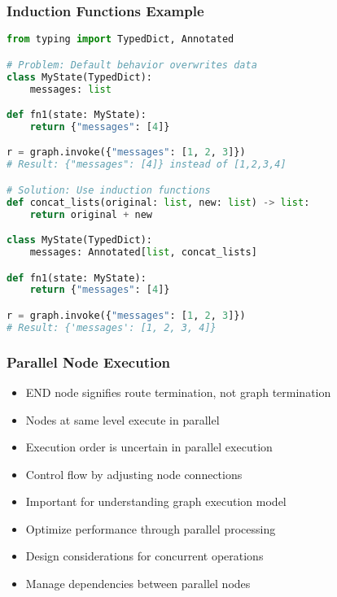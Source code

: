 \begin{frame}[fragile]\frametitle{Induction Functions Example}
      \begin{lstlisting}[language=Python, basicstyle=\tiny]
from typing import TypedDict, Annotated

# Problem: Default behavior overwrites data
class MyState(TypedDict):
    messages: list

def fn1(state: MyState):
    return {"messages": [4]}

r = graph.invoke({"messages": [1, 2, 3]})
# Result: {"messages": [4]} instead of [1,2,3,4]

# Solution: Use induction functions
def concat_lists(original: list, new: list) -> list:
    return original + new

class MyState(TypedDict):
    messages: Annotated[list, concat_lists]

def fn1(state: MyState):
    return {"messages": [4]}

r = graph.invoke({"messages": [1, 2, 3]})
# Result: {'messages': [1, 2, 3, 4]}
      \end{lstlisting}
\end{frame}

\begin{frame}[fragile]\frametitle{Parallel Node Execution}
      \begin{itemize}
        \item END node signifies route termination, not graph termination
        \item Nodes at same level execute in parallel
        \item Execution order is uncertain in parallel execution
        \item Control flow by adjusting node connections
        \item Important for understanding graph execution model
        \item Optimize performance through parallel processing
        \item Design considerations for concurrent operations
        \item Manage dependencies between parallel nodes
      \end{itemize}
\end{frame}

